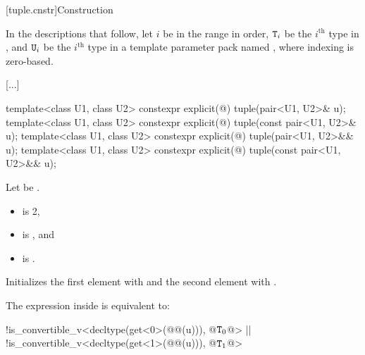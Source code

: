 \documentclass{wg21}
\begin{document}
[tuple.cnstr]{Construction}

\pnum
In the descriptions that follow, let $i$ be in the range
 in order, $\texttt{T}_i$
be the $i^\text{th}$ type in , and
$\texttt{U}_i$ be the $i^\text{th}$ type in a template parameter pack named , where indexing
is zero-based.

[...]

%
\begin{itemdecl}
    template<class U1, class U2> constexpr explicit(@\seebelow@) tuple(pair<U1, U2>& u);
    template<class U1, class U2> constexpr explicit(@\seebelow@) tuple(const pair<U1, U2>& u);
    template<class U1, class U2> constexpr explicit(@\seebelow@) tuple(pair<U1, U2>&& u);
    template<class U1, class U2> constexpr explicit(@\seebelow@) tuple(const pair<U1, U2>&& u);
\end{itemdecl}

\begin{itemdescr}
    \pnum
    Let  be .

    \pnum
    \constraints
    \begin{itemize}
        \item
         is 2,
        \item
         is , and
        \item
         is .
    \end{itemize}

    \pnum
    \effects
    Initializes the first element with  and
    the second element with .

    \pnum
    \remarks
    The expression inside  is equivalent to:
    \begin{codeblock}
        !is_convertible_v<decltype(get<0>(@@(u))), @$\texttt{T}_0$@> ||
        !is_convertible_v<decltype(get<1>(@@(u))), @$\texttt{T}_1$@>
    \end{codeblock}
\end{itemdescr}
\end{document}
